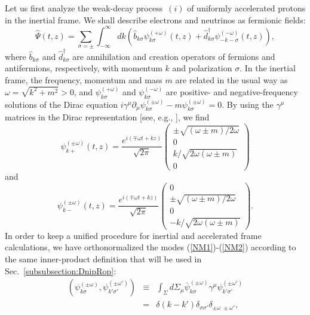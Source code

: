 \documentclass[12pt,nofootinbib,floatfix,aps,prd,showpacs,amsmath,amssymb,eqsecnum]{revtex4-2}
\begin{document}
Let us first analyze the weak-decay process~$(i)$ 
of uniformly accelerated protons in the inertial frame. 
We shall describe electrons and neutrinos as fermionic fields:  
\begin{equation}
\hat \Psi(t,z) \!=\! \sum_{\sigma = \pm } \int_{-\infty}^{\infty} dk
\left( \hat b_{k \sigma} \psi^{(+\omega)}_{k \sigma} (t,z)
     + \hat d^\dagger_{k \sigma} \psi^{(-\omega)}_{-k -\sigma} (t,z) 
\right),
\label{FF}
\end{equation}
where $ \hat b_{k \sigma} $ and $ \hat d^\dagger_{k \sigma} $ 
are annihilation and creation operators of fermions
and antifermions, respectively, with momentum $k$ and
polarization $\sigma$. In the inertial frame, the frequency,
momentum and mass $m$ are related in the usual way as
$\omega=\sqrt{k^2+m^2}>0$, and
$ \psi^{(+\omega)}_{k \sigma} $ and $ \psi^{(-\omega)}_{k \sigma} $
are positive- and negative-frequency solutions of the Dirac equation
$i\gamma^\mu \partial_\mu \psi^{(\pm \omega)}_{k \sigma} 
 - m \psi^{(\pm \omega)}_{k \sigma} =0$.
By using the $\gamma^\mu$ matrices in the 
Dirac representation [see, e.g., \textcite{IZbook}], we find
\begin{equation}
\psi^{(\pm \omega)}_{k +} (t,z) =
 \frac{e^{i(\mp \omega t + kz)}}{\sqrt{2\pi}}
\left(
\begin{array}{c}
\pm \sqrt{(\omega \pm m)/2\omega} \\
0\\
k/\sqrt{2\omega(\omega \pm m)}\\
0
\end{array}
\right)  
\label{NM1}
\end{equation}
and
\begin{equation}
\psi^{(\pm \omega)}_{k -} (t,z) = 
\frac{e^{i(\mp \omega t + kz)}}{\sqrt{2\pi}}
\left(
\begin{array}{c}
0\\
\pm \sqrt{(\omega \pm m)/2\omega} \\
0\\
-k/\sqrt{2\omega(\omega \pm m)}
\end{array}
\right).
\label{NM2}
\end{equation}
In order to keep a unified procedure for inertial and
accelerated frame calculations, 
we have orthonormalized the modes (\ref{NM1})-(\ref{NM2})
according to the same inner-product 
definition that will be used in Sec.~\ref{subsubsection:DnipRop}: 
\begin{eqnarray}
( 
\psi^{(\pm \omega)}_{k \sigma} , \psi^{(\pm \omega')}_{k' \sigma'} 
)  
&\equiv &
\int_\Sigma d\Sigma_\mu 
\bar \psi^{(\pm \omega)}_{k \sigma} \gamma^\mu 
\psi^{(\pm \omega')}_{k' \sigma'}
\nonumber \\
&=&
\delta(k-k') \delta_{\sigma \sigma'} 
\delta_{\pm \omega \; \pm \omega'},
\label{IP}
\end{eqnarray}
\end{document}
